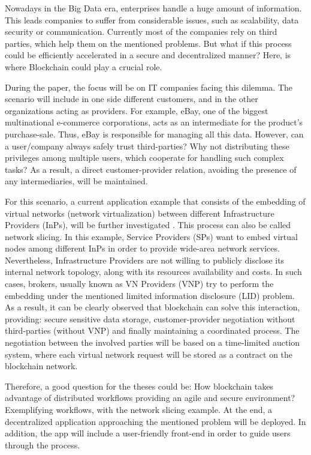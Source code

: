 Nowadays in the Big Data era, enterprises handle a huge amount of information. This leads companies to suffer from considerable issues, such as scalability, data security or communication. Currently most of the companies rely on third parties, which help them on the mentioned problems. But what if this process could be efficiently accelerated in a secure and decentralized manner? Here, is where Blockchain could play a crucial role.

During the paper, the focus will be on IT companies facing this dilemma. The scenario will include in one side different customers, and in the other organizations acting as providers. For example, eBay, one of the biggest multinational e-commerce corporations, acts as an intermediate for the product's purchase-sale. Thus, eBay is responsible for managing all this data. However, can a user/company always safely trust third-parties? Why not distributing these privileges among multiple users, which cooperate for handling such complex tasks? As a result, a direct customer-provider relation, avoiding the presence of any intermediaries, will be maintained.

For this scenario, a current application example that consists of the embedding of virtual networks (network virtualization) between different Infrastructure Providers (InPs), will be further investigated \cite{dietrich2015multi}. This process can also be called network slicing. In this example, Service Providers (SPs) want to embed virtual nodes among different InPs in order to provide wide-area network services. Nevertheless, Infrastructure Providers are not willing to publicly disclose its internal network topology, along with its resources availability and costs. In such cases, brokers, usually known as VN Providers (VNP) try to perform the embedding under the mentioned limited information disclosure (LID) problem. As a result, it can be clearly observed that blockchain can solve this interaction, providing: secure sensitive data storage, customer-provider negotiation without third-parties (without VNP) and finally maintaining a coordinated process. The negotiation between the involved parties will be based on a time-limited auction system, where each virtual network request will be stored as a contract on the blockchain network.

Therefore, a good question for the theses could be: How blockchain takes advantage of distributed workflows providing an agile and secure environment? Exemplifying workflows, with the network slicing example. At the end, a decentralized application approaching the mentioned problem will be deployed. In addition, the app will include a user-friendly front-end in order to guide users through the process. 

